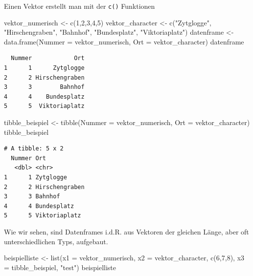 \documentclass[
  letterpaper,
  DIV=11,
  numbers=noendperiod]{scrreprt}
\newenvironment{Shaded}{\begin{snugshade}}{\end{snugshade}}
\newcommand{\AttributeTok}[1]{\textcolor[rgb]{0.40,0.45,0.13}{#1}}
\newcommand{\DecValTok}[1]{\textcolor[rgb]{0.68,0.00,0.00}{#1}}
\newcommand{\FunctionTok}[1]{\textcolor[rgb]{0.28,0.35,0.67}{#1}}
\newcommand{\NormalTok}[1]{\textcolor[rgb]{0.00,0.23,0.31}{#1}}
\newcommand{\OtherTok}[1]{\textcolor[rgb]{0.00,0.23,0.31}{#1}}
\newcommand{\StringTok}[1]{\textcolor[rgb]{0.13,0.47,0.30}{#1}}
\begin{document}
Einen Vektor erstellt man mit der \texttt{c()} Funktionen

\begin{Shaded}
\begin{Highlighting}[]
\NormalTok{vektor\_numerisch }\OtherTok{\textless{}{-}} \FunctionTok{c}\NormalTok{(}\DecValTok{1}\NormalTok{,}\DecValTok{2}\NormalTok{,}\DecValTok{3}\NormalTok{,}\DecValTok{4}\NormalTok{,}\DecValTok{5}\NormalTok{)}
\NormalTok{vektor\_character }\OtherTok{\textless{}{-}} \FunctionTok{c}\NormalTok{(}\StringTok{"Zytglogge"}\NormalTok{, }\StringTok{"Hirschengraben"}\NormalTok{, }\StringTok{"Bahnhof"}\NormalTok{, }\StringTok{"Bundesplatz"}\NormalTok{, }\StringTok{"Viktoriaplatz"}\NormalTok{)}
\NormalTok{datenframe }\OtherTok{\textless{}{-}} \FunctionTok{data.frame}\NormalTok{(}\AttributeTok{Nummer =}\NormalTok{ vektor\_numerisch, }\AttributeTok{Ort =}\NormalTok{ vektor\_character)}
\NormalTok{datenframe}
\end{Highlighting}
\end{Shaded}

\begin{verbatim}
  Nummer            Ort
1      1      Zytglogge
2      2 Hirschengraben
3      3        Bahnhof
4      4    Bundesplatz
5      5  Viktoriaplatz
\end{verbatim}

\begin{Shaded}
\begin{Highlighting}[]
\NormalTok{tibble\_beispiel }\OtherTok{\textless{}{-}} \FunctionTok{tibble}\NormalTok{(}\AttributeTok{Nummer =}\NormalTok{ vektor\_numerisch, }\AttributeTok{Ort =}\NormalTok{ vektor\_character)}
\NormalTok{tibble\_beispiel}
\end{Highlighting}
\end{Shaded}

\begin{verbatim}
# A tibble: 5 x 2
  Nummer Ort           
   <dbl> <chr>         
1      1 Zytglogge     
2      2 Hirschengraben
3      3 Bahnhof       
4      4 Bundesplatz   
5      5 Viktoriaplatz 
\end{verbatim}

Wie wir sehen, sind Datenframes i.d.R. aus Vektoren der gleichen Länge,
aber oft unterschiedlichen Typs, aufgebaut.

\begin{Shaded}
\begin{Highlighting}[]
\NormalTok{beispielliste }\OtherTok{\textless{}{-}} \FunctionTok{list}\NormalTok{(}\AttributeTok{x1 =}\NormalTok{ vektor\_numerisch, }\AttributeTok{x2 =}\NormalTok{ vektor\_character, }\FunctionTok{c}\NormalTok{(}\DecValTok{6}\NormalTok{,}\DecValTok{7}\NormalTok{,}\DecValTok{8}\NormalTok{), }\AttributeTok{x3 =}\NormalTok{ tibble\_beispiel, }\StringTok{"test"}\NormalTok{)}
\NormalTok{beispielliste}
\end{Highlighting}
\end{Shaded}
\end{document}
